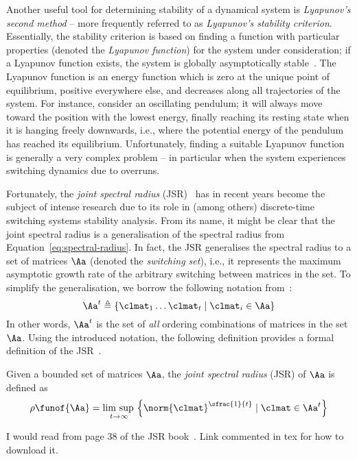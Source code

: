 Another useful tool for determining stability of a dynamical system is \emph{Lyapunov's second method} -- more frequently referred to as \emph{Lyapunov's stability criterion}.
Essentially, the stability criterion is based on finding a function with particular properties (denoted the \emph{Lyapunov function}) for the system under consideration; if a Lyapunov function exists, the system is globally asymptotically stable~\cite{Astrom:1997}.
The Lyapunov function is an energy function which is zero at the unique point of equilibrium, positive everywhere else, and decreases along all trajectories of the system.
For instance, consider an oscillating pendulum; it will always move toward the position with the lowest energy, finally reaching its resting state when it is hanging freely downwards, i.e., where the potential energy of the pendulum has reached its equilibrium.
Unfortunately, finding a suitable Lyapunov function is generally a very complex problem -- in particular when the system experiences switching dynamics due to overruns.

Fortunately, the \emph{joint spectral radius} (JSR)~\cite{Rota:1960} has in recent years become the subject of intense research due to its role in (among others) discrete-time switching systems stability analysis.
From its name, it might be clear that the joint spectral radius is a generalisation of the spectral radius from Equation~\eqref{eq:spectral-radius}.
In fact, the JSR generalises the spectral radius to a set of matrices $\Aa$ (denoted the \emph{switching set}), i.e., it represents the maximum asymptotic growth rate of the arbitrary switching between matrices in the set.
To simplify the generalisation, we borrow the following notation from~\cite{Jungers:2009}:
%
\begin{equation}
    \Aa^t \triangleq \left\{ \clmat_1 \ldots \clmat_t \mid \clmat_i \in \Aa \right\}
\end{equation}
%
In other words, $\Aa^t$ is the set of \emph{all} ordering combinations of matrices in the set $\Aa$.
Using the introduced notation, the following definition provides a formal definition of the JSR~\cite{Jungers:2009}.
%
\begin{definition}%
    \label{def:jsr}%
    Given a bounded set of matrices $\Aa$, the \emph{joint spectral radius} (JSR) of $\Aa$ is defined as
    \begin{equation*}
        \rho\funof{\Aa} = \underset{t\rightarrow\infty}{\lim{}\sup{}} \left\{ \norm{\clmat}^{\sfrac{1}{t}} \mid \clmat \in \Aa^t \right\}
    \end{equation*}
\end{definition}
{I would read from page 38 of the JSR book~\cite{Jungers:2009}. Link commented in tex for how to download it.} 

